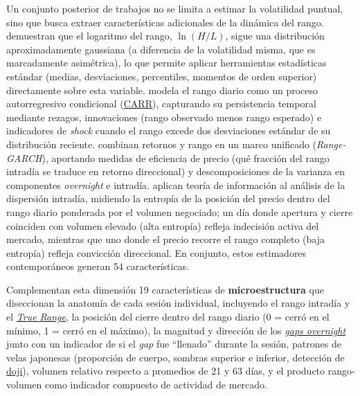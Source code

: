 Un conjunto posterior de trabajos no se limita a estimar la volatilidad puntual, sino que busca extraer caracter\'isticas adicionales de la din\'amica del rango. \citet{alizadeh2002} demuestran que el logaritmo del rango, $\ln(H/L)$, sigue una distribuci\'on aproximadamente gaussiana (a diferencia de la volatilidad misma, que es marcadamente asim\'etrica), lo que permite aplicar herramientas estad\'isticas est\'andar (medias, desviaciones, percentiles, momentos de orden superior) directamente sobre esta variable. \citet{chou2005} modela el rango diario como un proceso autorregresivo condicional (\hyperlink{glos:carr}{CARR}), capturando su persistencia temporal mediante rezagos, innovaciones (rango observado menos rango esperado) e indicadores de \textit{shock} cuando el rango excede dos desviaciones est\'andar de su distribuci\'on reciente. \citet{fiszeder2016} combinan retornos y rango en un marco unificado (\textit{Range-GARCH}), aportando medidas de eficiencia de precio (qu\'e fracci\'on del rango intrad\'ia se traduce en retorno direccional) y descomposiciones de la varianza en componentes \textit{overnight} e intrad\'ia. \citet{vinte2021} aplican teor\'ia de informaci\'on al an\'alisis de la dispersi\'on intrad\'ia, midiendo la entrop\'ia de la posici\'on del precio dentro del rango diario ponderada por el volumen negociado; un d\'ia donde apertura y cierre coinciden con volumen elevado (alta entrop\'ia) refleja indecisi\'on activa del mercado, mientras que uno donde el precio recorre el rango completo (baja entrop\'ia) refleja convicci\'on direccional. En conjunto, estos estimadores contempor\'aneos generan 54 caracter\'isticas.

Complementan esta dimensi\'on 19 caracter\'isticas de \textbf{microestructura} que diseccionan la anatom\'ia de cada sesi\'on individual, incluyendo el rango intrad\'ia y el \hyperlink{glos:true_range}{\textit{True Range}}, la posici\'on del cierre dentro del rango diario (0 = cerr\'o en el m\'inimo, 1 = cerr\'o en el m\'aximo), la magnitud y direcci\'on de los \hyperlink{glos:gap_overnight}{\textit{gaps overnight}} junto con un indicador de si el \textit{gap} fue ``llenado'' durante la sesi\'on, patrones de velas japonesas (proporci\'on de cuerpo, sombras superior e inferior, detecci\'on de \hyperlink{glos:doji}{doji}), volumen relativo respecto a promedios de 21 y 63 d\'ias, y el producto rango-volumen como indicador compuesto de actividad de mercado.


